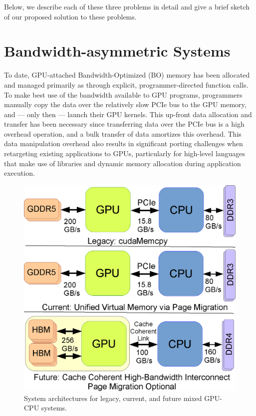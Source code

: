 Below, we describe each of these three problems in detail and give a brief
sketch of our proposed solution to these problems.

\section{Bandwidth-asymmetric Systems}
To date, GPU-attached Bandwidth-Optimized (BO) memory has been allocated and
managed primarily as through explicit, programmer-directed function calls.
To make best use of the bandwidth available to GPU programs, programmers
manually copy the data over the relatively slow PCIe bus to the GPU memory, and
--- only then --- launch their GPU kernels.  This up-front data allocation and
transfer has been necessary since transferring data over the PCIe bus is a high
overhead operation, and a bulk transfer of data amortizes this overhead. This
data manipulation overhead also results in significant porting challenges when
retargeting existing applications to GPUs, particularly for high-level languages
that make use of libraries and dynamic memory allocation during application
execution.

\begin{figure}[t]
    \centering
    \includegraphics[width=0.7\columnwidth]{hpca2015/figures/architecture.eps}
    \caption{System architectures for legacy, current, and future mixed GPU-CPU systems.}
    \label{fig:arch-hpca2015}
\end{figure}

